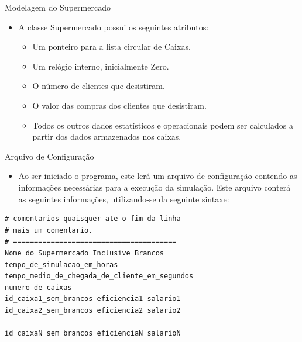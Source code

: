 \documentclass[12pt,table,xcolor={dvipsnames}]{beamer}
\begin{document}
\begin{frame}[fragile]{Modelagem do Supermercado}
\begin{itemize}
\item A classe Supermercado possui os seguintes atributos:
\begin{itemize}
\item Um ponteiro para a lista circular de Caixas.
\item Um relógio interno, inicialmente Zero.
\item O número de clientes que desistiram.
\item O valor das compras dos clientes que desistiram.
\item Todos os outros dados estatísticos e operacionais podem ser calculados a partir dos dados armazenados nos caixas.
\end{itemize}
\end{itemize}
\end{frame}

\begin{frame}[fragile]{Arquivo de Configuração}

\begin{itemize}
\item Ao ser iniciado o programa, este lerá um arquivo de configuração contendo as informações necessárias para a execução da simulação. Este arquivo conterá as seguintes informações, utilizando-se da seguinte sintaxe:
\end{itemize}
\begin{lstlisting}
# comentarios quaisquer ate o fim da linha 
# mais um comentario. 
# ======================================= 
Nome do Supermercado Inclusive Brancos 
tempo_de_simulacao_em_horas 
tempo_medio_de_chegada_de_cliente_em_segundos 
numero de caixas 
id_caixa1_sem_brancos eficiencia1 salario1 
id_caixa2_sem_brancos eficiencia2 salario2 
- - - 
id_caixaN_sem_brancos eficienciaN salarioN
\end{lstlisting}
\end{frame}
\end{document}
